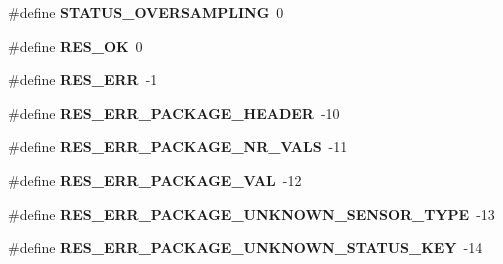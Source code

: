\begin{DoxyCompactItemize}
\item 
\hypertarget{group___engduino_protocol_gad0b47eed6ef2df85e6b7fc96ac038ffa}{}\#define {\bfseries S\+T\+A\+T\+U\+S\+\_\+\+O\+V\+E\+R\+S\+A\+M\+P\+L\+I\+N\+G}~0\label{group___engduino_protocol_gad0b47eed6ef2df85e6b7fc96ac038ffa}

\item 
\hypertarget{group___engduino_protocol_ga312c04ce416e0afdbd653394e36a117d}{}\#define {\bfseries R\+E\+S\+\_\+\+O\+K}~0\label{group___engduino_protocol_ga312c04ce416e0afdbd653394e36a117d}

\item 
\hypertarget{group___engduino_protocol_gad9b60befde3a0fbe72125fc46611f344}{}\#define {\bfseries R\+E\+S\+\_\+\+E\+R\+R}~-\/1\label{group___engduino_protocol_gad9b60befde3a0fbe72125fc46611f344}

\item 
\hypertarget{group___engduino_protocol_ga2cd91db027485b327c21a1b2df5413ff}{}\#define {\bfseries R\+E\+S\+\_\+\+E\+R\+R\+\_\+\+P\+A\+C\+K\+A\+G\+E\+\_\+\+H\+E\+A\+D\+E\+R}~-\/10\label{group___engduino_protocol_ga2cd91db027485b327c21a1b2df5413ff}

\item 
\hypertarget{group___engduino_protocol_gab35d3dd2955d68b77e95e31824cd819d}{}\#define {\bfseries R\+E\+S\+\_\+\+E\+R\+R\+\_\+\+P\+A\+C\+K\+A\+G\+E\+\_\+\+N\+R\+\_\+\+V\+A\+L\+S}~-\/11\label{group___engduino_protocol_gab35d3dd2955d68b77e95e31824cd819d}

\item 
\hypertarget{group___engduino_protocol_gaae5d207a5a0bca429c9cfa8d15b56069}{}\#define {\bfseries R\+E\+S\+\_\+\+E\+R\+R\+\_\+\+P\+A\+C\+K\+A\+G\+E\+\_\+\+V\+A\+L}~-\/12\label{group___engduino_protocol_gaae5d207a5a0bca429c9cfa8d15b56069}

\item 
\hypertarget{group___engduino_protocol_gaa1efbc1d75f47a7e18b96ed0abd99cb2}{}\#define {\bfseries R\+E\+S\+\_\+\+E\+R\+R\+\_\+\+P\+A\+C\+K\+A\+G\+E\+\_\+\+U\+N\+K\+N\+O\+W\+N\+\_\+\+S\+E\+N\+S\+O\+R\+\_\+\+T\+Y\+P\+E}~-\/13\label{group___engduino_protocol_gaa1efbc1d75f47a7e18b96ed0abd99cb2}

\item 
\hypertarget{group___engduino_protocol_ga829f526b9b829f7cc3056f815953f6dd}{}\#define {\bfseries R\+E\+S\+\_\+\+E\+R\+R\+\_\+\+P\+A\+C\+K\+A\+G\+E\+\_\+\+U\+N\+K\+N\+O\+W\+N\+\_\+\+S\+T\+A\+T\+U\+S\+\_\+\+K\+E\+Y}~-\/14\label{group___engduino_protocol_ga829f526b9b829f7cc3056f815953f6dd}


\end{DoxyCompactItemize}
